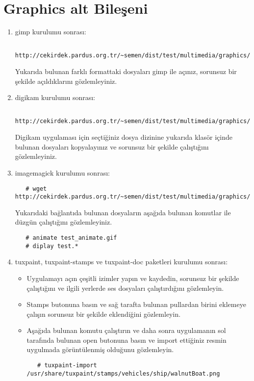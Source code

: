 \documentclass[a4paper,10pt]{article}
\begin{document}
\section{Graphics alt Bileşeni}
\begin{enumerate}
 \item gimp kurulumu sonrası:
  \begin{verbatim}
   http://cekirdek.pardus.org.tr/~semen/dist/test/multimedia/graphics/graphics.tar
  \end{verbatim}

 Yukarıda bulunan farklı formattaki dosyaları gimp ile açınız, sorunsuz bir şekilde açıldıklarını gözlemleyiniz.
\item digikam kurulumu sonrası:

  \begin{verbatim}
   http://cekirdek.pardus.org.tr/~semen/dist/test/multimedia/graphics/graphics.tar
  \end{verbatim}

 Digikam uygulaması için seçtiğiniz dosya dizinine yukarıda klasör içinde bulunan dosyaları kopyalayınız ve sorunsuz bir şekilde çalıştığını gözlemleyiniz.
\item imagemagick kurulumu sonrası:
  \begin{verbatim}
   # wget http://cekirdek.pardus.org.tr/~semen/dist/test/multimedia/graphics/graphics.tar
  \end{verbatim}

Yukarıdaki bağlantıda bulunan dosyaların aşağıda bulunan komutlar ile düzgün çalıştığını gözlemleyiniz.
  \begin{verbatim}
   # animate test_animate.gif
   # diplay test.*
  \end{verbatim}
\item tuxpaint, tuxpaint-stamps ve tuxpaint-doc paketleri kurulumu sonrası:
  \begin{itemize}
   \item  Uygulamayı açın çeşitli izimler yapın ve kaydedin, sorunsuz bir şekilde çalıştığını ve ilgili yerlerde ses dosyaları çalıştırdığını gözlemleyin.
   \item Stamps butonuna basın ve sağ tarafta bulunan pullardan birini eklemeye çalışın sorunsuz bir şekilde eklendiğini gözlemleyin.
   \item Aşağıda bulunan komutu çalıştırın ve daha sonra uygulamanın sol tarafında bulunan open butonuna basın ve import ettiğiniz resmin uygulmada görüntülenmiş olduğunu gözlemleyin.
\begin{verbatim}
   # tuxpaint-import /usr/share/tuxpaint/stamps/vehicles/ship/walnutBoat.png
\end{verbatim} 
\end{itemize}


\end{enumerate}
\end{document}
